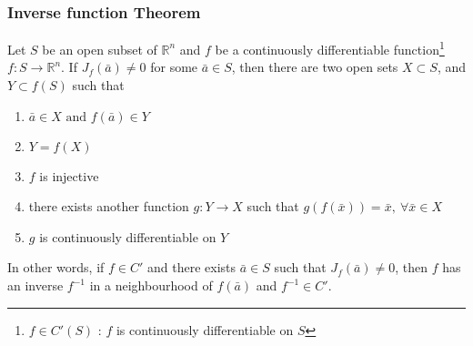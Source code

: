\subsubsection{Inverse function Theorem}
\begin{theorem}
Let $S$ be an open subset of $\mathbb{R}^n$ and $f$ be a continuously differentiable function\footnote{$f \in C'(S)$ : $f$ is continuously differentiable on $S$} $f : S \to \mathbb{R}^n$.
If $J_f(\bar{a}) \ne 0$ for some $\bar{a} \in S$, then there are two open sets $X \subset S$, and $Y \subset f(S)$ such that
\begin{enumerate}
	\item $\bar{a} \in X \text{ and } f(\bar{a}) \in Y$
	\item $Y = f(X)$
	\item $f$ is injective
	\item there exists another function $g : Y \to X$ such that $g(f(\bar{x})) = \bar{x},\ \forall \bar{x} \in X$
	\item $g$ is continuously differentiable on $Y$
\end{enumerate}
\begin{commentary}
	In other words, if $f \in C'$ and there exists $\bar{a} \in S$ such that $J_f(\bar{a}) \ne 0$, then $f$ has an inverse $f^{-1}$ in a neighbourhood of $f(\bar{a})$ and $f^{-1} \in C'$.
\end{commentary}
\end{theorem}
